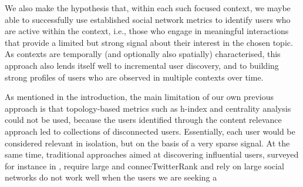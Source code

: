 \documentclass[runningheads]{llncs}
\begin{document}
We also make the hypothesis that, within each such focused context, we maybe able to  successfully use established social network metrics to identify users who are active within the context, i.e., those who engage in meaningful interactions that provide a limited but strong signal about their interest in the chosen topic. 
%
As contexts are temporally (and optionally also spatially) characterised, this approach also lends itself well to incremental user discovery,  and to building strong profiles of users who are observed in multiple contexts over time.





As mentioned in the introduction, the main limitation of our own previous approach 	\cite{Missier2017,Sousa2018,Barros2018} is that topology-based metrics such as h-index and centrality analysis could not be used, because the users identified through the content relevance approach led to collections of disconnected users. Essentially, each user would be considered relevant in isolation, but on the basis of a very sparse signal.
%
At the same time, traditional approaches aimed at discovering influential users, surveyed for instance in \cite{RIQUELME2016949}, require large and connecTwitterRank and rely on large social networks do not work well when the users we are seeking a 
\end{document}
